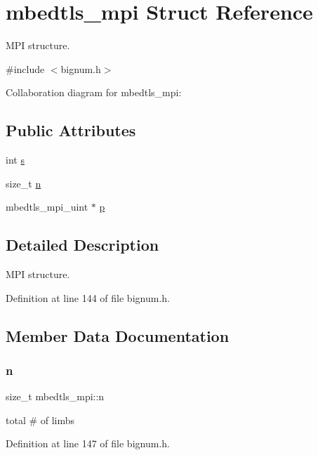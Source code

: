 \hypertarget{structmbedtls__mpi}{}\section{mbedtls\+\_\+mpi Struct Reference}
\label{structmbedtls__mpi}


M\+PI structure.  




{\ttfamily \#include $<$bignum.\+h$>$}



Collaboration diagram for mbedtls\+\_\+mpi\+:
\subsection*{Public Attributes}
\begin{DoxyCompactItemize}
\item 
int \mbox{\hyperlink{structmbedtls__mpi_a98e0b295f053643085b1c756857c3477}{s}}
\item 
size\+\_\+t \mbox{\hyperlink{structmbedtls__mpi_a09fab4ba4d22d47ecf987e9cf2dccf13}{n}}
\item 
mbedtls\+\_\+mpi\+\_\+uint $\ast$ \mbox{\hyperlink{structmbedtls__mpi_af0af10ca10e97e8bce41da588600836e}{p}}
\end{DoxyCompactItemize}


\subsection{Detailed Description}
M\+PI structure. 

Definition at line 144 of file bignum.\+h.



\subsection{Member Data Documentation}
\mbox{\label{structmbedtls__mpi_a09fab4ba4d22d47ecf987e9cf2dccf13}} 
\subsubsection{\texorpdfstring{n}{n}}
{\footnotesize\ttfamily size\+\_\+t mbedtls\+\_\+mpi\+::n}

total \# of limbs 

Definition at line 147 of file bignum.\+h.

